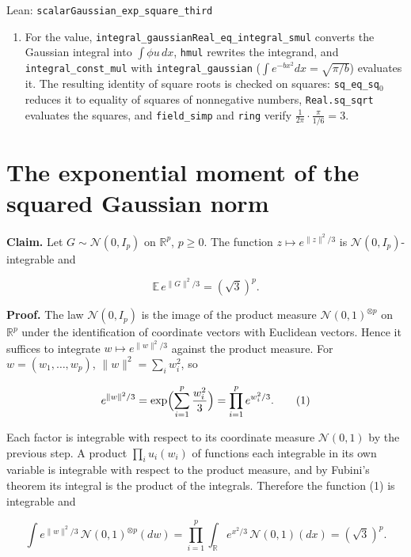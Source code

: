 \documentclass[11pt,a4paper]{article}
\begin{document}
\begin{leanbox}{Lean: \texttt{scalarGaussian\_\allowbreak{}exp\_\allowbreak{}square\_\allowbreak{}third}}
\begin{enumerate}
\item For the value, \texttt{integral\_\allowbreak{}gaussian\allowbreak{}Real\_\allowbreak{}eq\_\allowbreak{}integral\_\allowbreak{}smul} converts the Gaussian integral into \(\int\phi u\,dx\), \texttt{hmul} rewrites the integrand, and \texttt{integral\_\allowbreak{}const\_\allowbreak{}mul} with \texttt{integral\_\allowbreak{}gaussian} (\(\int e^{-bx^2}dx=\sqrt{\pi/b}\)) evaluates it. The resulting identity of square roots is checked on squares: \texttt{sq\_\allowbreak{}eq\_\allowbreak{}sq\ensuremath{{}_{0}}} reduces it to equality of squares of nonnegative numbers, \texttt{Real.\allowbreak{}sq\_\allowbreak{}sqrt} evaluates the squares, and \texttt{field\_\allowbreak{}simp} and \texttt{ring} verify \(\frac{1}{2\pi}\cdot\frac{\pi}{1/6}=3\).

\end{enumerate}
\end{leanbox}

\section{\texorpdfstring{The exponential moment of the squared Gaussian norm}{The exponential moment of the squared Gaussian norm}}


\textbf{Claim.} Let \(G\sim\mathcal N(0,I_p)\) on \(\mathbb R^p\), \(p\ge0\). The function \(z\mapsto e^{\|z\|^2/3}\) is \(\mathcal N(0,I_p)\)-integrable and


\[\mathbb E\,e^{\|G\|^2/3}=(\sqrt3)^p.\]


\textbf{Proof.} The law \(\mathcal N(0,I_p)\) is the image of the product measure \(\mathcal N(0,1)^{\otimes p}\) on \(\mathbb R^p\) under the identification of coordinate vectors with Euclidean vectors. Hence it suffices to integrate \(w\mapsto e^{\|w\|^2/3}\) against the product measure. For \(w=(w_1,\dots,w_p)\), \(\|w\|^2=\sum_iw_i^2\), so


\[e^{\|w\|^2/3}=\exp\Bigl(\sum_{i=1}^p\frac{w_i^2}{3}\Bigr)=\prod_{i=1}^pe^{w_i^2/3}.\qquad(1)\]


Each factor is integrable with respect to its coordinate measure \(\mathcal N(0,1)\) by the previous step. A product \(\prod_iu_i(w_i)\) of functions each integrable in its own variable is integrable with respect to the product measure, and by Fubini's theorem its integral is the product of the integrals. Therefore the function (1) is integrable and


\[\int e^{\|w\|^2/3}\,\mathcal N(0,1)^{\otimes p}(dw)=\prod_{i=1}^p\int_{\mathbb R}e^{x^2/3}\,\mathcal N(0,1)(dx)=(\sqrt3)^p.\]
\end{document}
